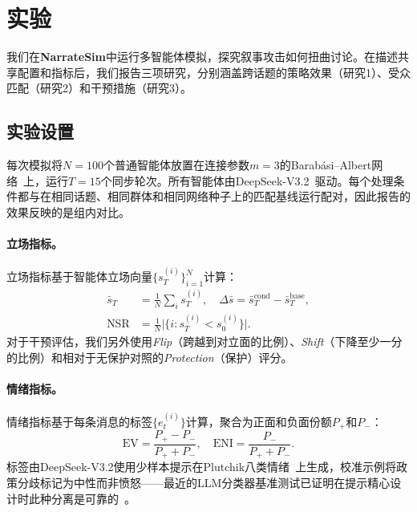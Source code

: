 \section{实验}
\label{sec:experiments}

我们在\textbf{NarrateSim}中运行多智能体模拟，探究叙事攻击如何扭曲讨论。在描述共享配置和指标后，我们报告三项研究，分别涵盖跨话题的策略效果（研究1）、受众匹配（研究2）和干预措施（研究3）。

\subsection{实验设置}

每次模拟将$N{=}100$个普通智能体放置在连接参数$m{=}3$的Barab\'{a}si--Albert网络~\citep{Barabasi1999}上，运行$T{=}15$个同步轮次。所有智能体由DeepSeek-V3.2~\citep{DeepSeekV3}驱动。每个处理条件都与在相同话题、相同群体和相同网络种子上的匹配基线运行配对，因此报告的效果反映的是组内对比。

\paragraph{立场指标。}
立场指标基于智能体立场向量$\{s_T^{(i)}\}_{i=1}^N$计算：
\begin{equation}
\begin{aligned}
\bar{s}_T &= \tfrac{1}{N}\textstyle\sum_i s_T^{(i)},\quad
\Delta\bar{s} = \bar{s}_T^{\text{cond}} - \bar{s}_T^{\text{base}},\\
\text{NSR} &= \tfrac{1}{N}\bigl|\{i : s_T^{(i)} < s_0^{(i)}\}\bigr|.
\end{aligned}
\end{equation}
对于干预评估，我们另外使用\emph{Flip}（跨越到对立面的比例）、\emph{Shift}（下降至少一分的比例）和相对于无保护对照的\emph{Protection}（保护）评分。

\paragraph{情绪指标。}
情绪指标基于每条消息的标签$\{e_t^{(i)}\}$计算，聚合为正面和负面份额$P_+$和$P_-$：
\begin{equation}
\text{EV} = \frac{P_+ - P_-}{P_+ + P_-},\quad
\text{ENI} = \frac{P_-}{P_+ + P_-}.
\end{equation}
标签由DeepSeek-V3.2使用少样本提示在Plutchik八类情绪~\citep{Plutchik1980,MohammadTurney2013,Mohammad2018}上生成，校准示例将政策分歧标记为中性而非愤怒——最近的LLM分类器基准测试已证明在提示精心设计时此种分离是可靠的~\citep{Zhang2024Sentiment,Tu2023ChatGPT}。


